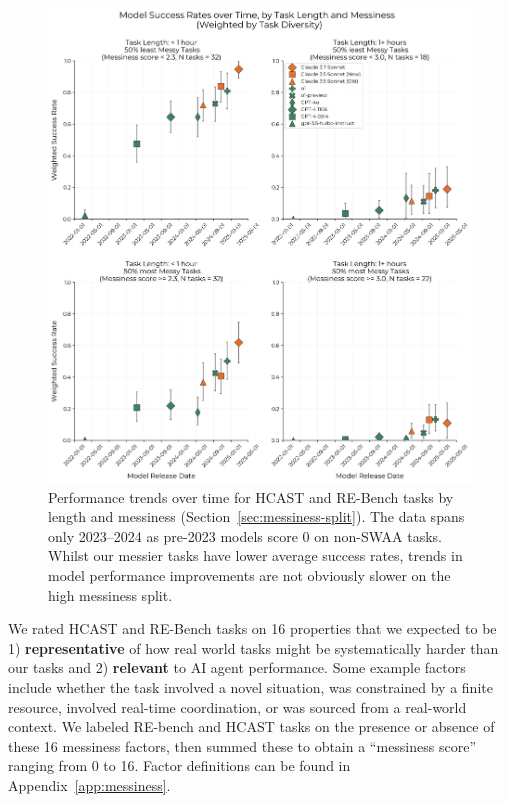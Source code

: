 \documentclass{article}
\newcommand{\gabenchmark}{HCAST}
\begin{document}
\begin{figure}
    \centering
    \vspace{-20pt}
    \includegraphics[width=0.9\linewidth]{plots/messiness/success_trend_by_messiness_and_length_with_boundary_0.5.png}
    \caption{Performance trends over time for \gabenchmark{} and RE-Bench tasks by length and messiness (Section~\ref{sec:messiness-split}). The data spans only 2023--2024 as pre-2023 models score 0 on non-SWAA tasks. Whilst our messier tasks have lower average success rates, trends in model performance improvements are not obviously slower on the high messiness split.}
    \label{fig:2x2}
\end{figure}

We rated \gabenchmark{} and RE-Bench tasks on 16 properties that we expected to be 1) \textbf{representative} of how real world tasks might be systematically harder than our tasks and 2) \textbf{relevant} to AI agent performance. Some example factors include whether the task involved a novel situation, was constrained by a finite resource, involved real-time coordination, or was sourced from a real-world context. We labeled RE-bench and \gabenchmark{} tasks on the presence or absence of these 16 messiness factors, then summed these to obtain a ``messiness score'' ranging from 0 to 16. Factor definitions can be found in Appendix~\ref{app:messiness}.
\end{document}
